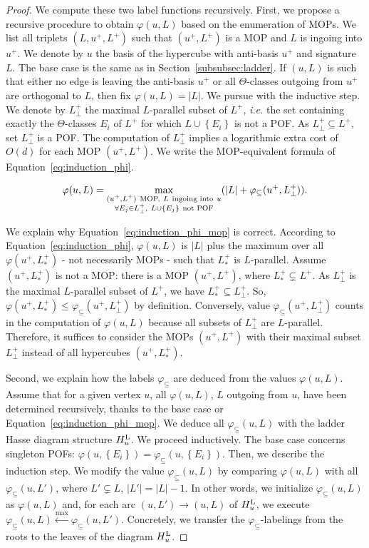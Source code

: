 \documentclass{article}
\newcommand{\set}[1]{\left\{ #1 \right\}}
\newcommand{\card}[1]{\left| #1 \right|}
\newcommand{\hul}{H_u^{\mbox{\scriptsize{L}}}}
\newcommand{\varphis}{\varphi_{\subseteq}}
\begin{document}
\begin{proof}
We compute these two label functions recursively. First, we propose a recursive procedure to obtain $\varphi(u,L)$ based on the enumeration of MOPs. We list all triplets $(L,u^+,L^+)$ such that $(u^+,L^+)$ is a MOP and $L$ is ingoing into $u^+$. We denote by $u$ the basis of the hypercube with anti-basis $u^+$ and signature $L$. 
The base case is the same as in Section~\ref{subsubsec:ladder}. If $(u,L)$ is such that either no edge is leaving the anti-basis $u^+$ or all $\Theta$-classes outgoing from $u^+$ are orthogonal to $L$, then fix $\varphi(u,L) = \card{L}$. 
We pursue with the inductive step. We denote by $L_{\perp}^+$ the maximal $L$-parallel subset of $L^+$, {\em i.e.} the set containing exactly the $\Theta$-classes $E_i$ of $L^+$ for which $L \cup \set{E_i}$ is not a POF. As $L_{\perp}^+ \subseteq L^+$, set $L_{\perp}^+$ is a POF. The computation of $L_{\perp}^+$ implies a logarithmic extra cost of $O(d)$ for each MOP $(u^+,L^+)$. We write the MOP-equivalent formula of Equation~\eqref{eq:induction_phi}.

\begin{equation}
     \varphi(u,L) = \max\limits_{\substack{(u^+,L^+) ~\mbox{\scriptsize{MOP,}}~ L ~\mbox{\scriptsize{ingoing into}}~ u  \\ \forall E_j \in L_{\perp}^+,~ L \cup \set{E_j} ~\mbox{\scriptsize{not POF}}}} (\card{L} + \varphis(u^+,L_{\perp}^+)).
    \label{eq:induction_phi_mop}
\end{equation}

We explain why Equation~\eqref{eq:induction_phi_mop} is correct. According to Equation~\eqref{eq:induction_phi}, $\varphi(u,L)$ is $\card{L}$ plus the maximum over all $\varphi(u^+,L_*^+)$ - not necessarily MOPs - such that $L_*^+$ is $L$-parallel. Assume $(u^+,L_*^+)$ is not a MOP: there is a MOP $(u^+,L^+)$, where $L_*^+ \subsetneq L^+$. As $L_{\perp}^+$ is the maximal $L$-parallel subset of $L^+$, we have $L_*^+ \subseteq L_{\perp}^+$. So, $\varphi(u^+,L_*^+) \le \varphis(u^+,L_{\perp}^+)$ by definition. Conversely, value $\varphis(u^+,L_{\perp}^+)$ counts in the computation of $\varphi(u,L)$ because all subsets of $L_{\perp}^+$ are $L$-parallel. Therefore, it suffices to consider the MOPs $(u^+,L^+)$ with their maximal subset $L_{\perp}^+$ instead of all hypercubes $(u^+,L_*^+)$.

Second, we explain how the labels $\varphis$ are deduced from the values $\varphi(u,L)$. Assume that for a given vertex $u$, all $\varphi(u,L)$, $L$ outgoing from $u$, have been determined recursively, thanks to the base case or Equation~\eqref{eq:induction_phi_mop}. We deduce all $\varphis(u,L)$ with the ladder Hasse diagram structure $\hul$. We proceed inductively. The base case concerns singleton POFs: $\varphi(u,\set{E_i}) = \varphis(u,\set{E_i})$. Then, we describe the induction step. We modify the value $\varphis(u,L)$ by comparing $\varphi(u,L)$ with all $\varphis(u,L')$, where $L' \subsetneq L$, $\card{L'} = \card{L} -1$. In other words, we initialize $\varphis(u,L)$ as $\varphi(u,L)$ and, for each arc $(u,L')\rightarrow (u,L)$ of $\hul$, we execute $\varphis(u,L) \xleftarrow{\max} \varphis(u,L')$. Concretely, we transfer the $\varphis$-labelings from the roots to the leaves of the diagram $\hul$.


\end{proof}
\end{document}
